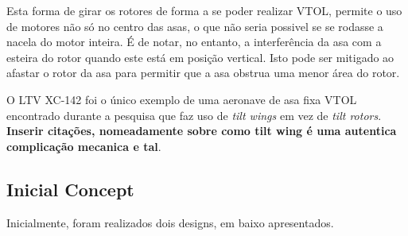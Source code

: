 \FloatBarrier
Esta forma de girar os rotores de forma a se poder realizar VTOL, permite o uso de motores não só no centro das asas, o que não seria possivel se se rodasse a nacela do motor inteira. É de notar, no entanto, a interferência da asa com a esteira do rotor quando este está em posição vertical. Isto pode ser mitigado ao afastar o rotor da asa para permitir que a asa obstrua uma menor área do rotor.\par
O LTV XC-142 foi o único exemplo de uma aeronave de asa fixa VTOL encontrado durante a pesquisa que faz uso de \textit{tilt wings} em vez de \textit{tilt rotors}. {\Large{\textbf{Inserir citações, nomeadamente sobre como tilt wing é uma autentica complicação mecanica e tal}}}.\par
\subsection{Inicial Concept}
Inicialmente, foram realizados dois designs, em baixo apresentados.
\FloatBarrier
